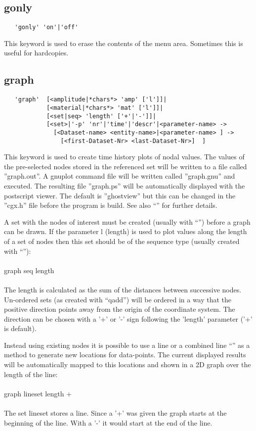 \documentclass{article}
\begin{document}
\subsection{\label{gonly}gonly}
\begin{verbatim}
   'gonly' 'on'|'off' 
\end{verbatim}
This keyword is used to erase the contents of the menu area. Sometimes this is useful for hardcopies.

\subsection{\label{graph}graph}
\begin{verbatim}
   'graph'  [<amplitude|*chars*> 'amp' ['l']]|
            [<material|*chars*> 'mat' ['l']]|
            [<set|seq> 'length' ['+'|'-']]| 
            [<set>|'-p' 'nr'|'time'|'descr'|<parameter-name> ->
              [<Dataset-name> <entity-name>|<parameter-name> ] ->
                [<first-Dataset-Nr> <last-Dataset-Nr>]  ]
\end{verbatim}
This keyword is used to create time history plots of nodal values. The values of the pre-selected nodes stored in the referenced set will be written to a file called ''graph.out''. A gnuplot command file will be written called ''graph.gnu'' and executed. The resulting file ''graph.ps'' will be automatically displayed with the postscript viewer. The default is ''ghostview'' but this can be changed in the ''cgx.h'' file before the program is build. See also ``'' for further details.

A set with the nodes of interest must be created (usually with ``'') before a graph can be drawn. If the parameter l (length) is used to plot values along the length of a set of nodes then this set should be of the sequence type (usually created with ``''):\\\\graph seq length\\\\The length is calculated as the sum of the distances between successive nodes. Un-ordered sets (as created with ``qadd'') will be ordered in a way that the positive direction points away from the origin of the coordinate system. The direction can be chosen with a '+' or '-' sign following the 'length' parameter ('+' is default).

Instead using existing nodes it is possible to use a line or a combined line ``'' as a method to generate new locations for data-points. The current displayed results will be automatically mapped to this locations and shown in a 2D graph over the length of the line:\\\\graph lineset length +\\\\The set lineset stores a line. Since a '+' was given the graph starts at the beginning of the line. With a '-' it would start at the end of the line. 
\end{document}
